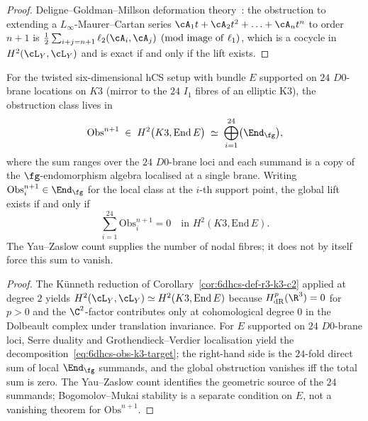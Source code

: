 \begin{proof}
Deligne--Goldman--Millson deformation
theory~\cite[Ch.~4]{CostelloGwilliam2017}: the obstruction to
extending a $L_\infty$-Maurer--Cartan series $\cA_1 t +
\cA_2 t^2 + \ldots + \cA_n t^n$ to order $n+1$ is
$\tfrac12\sum_{i+j = n+1}\ell_2(\cA_i,\cA_j) \pmod{\mathrm{image\
of\ }\ell_1}$, which is a cocycle in
$H^2(\cL_Y,\cL_Y)$ and is exact if and only if the lift exists.
\end{proof}

\begin{corollary}[Obstruction for $Y = \R^3\times K3\times\C^2$
 with $24$ $D0$-branes; \ClaimStatusProvedHere]
\label{cor:6dhcs-obs-k3}
For the twisted six-dimensional hCS setup with bundle $E$ supported on
$24$ $D0$-brane locations on $K3$ (mirror to the $24$ $I_1$ fibres of
an elliptic K3), the obstruction class lives in
\begin{equation}\label{eq:6dhcs-obs-k3-target}
 \mathrm{Obs}^{n+1} \;\in\; H^2\bigl(K3,\mathrm{End}\,E\bigr)
 \;\simeq\;
 \bigoplus_{i = 1}^{24}\bigl(\End_{\fg}\bigr),
\end{equation}
where the sum ranges over the $24$ $D0$-brane loci and each summand
is a copy of the $\fg$-endomorphism algebra localised at a single
brane. Writing
\(\mathrm{Obs}^{n+1}_i\in\End_\fg\) for the local class at the
\(i\)-th support point, the global lift exists if and only if
\[
 \sum_{i=1}^{24}\mathrm{Obs}^{n+1}_i=0
 \quad\text{in }H^2(K3,\mathrm{End}\,E).
\]
The Yau--Zaslow count supplies the number of nodal fibres; it does not
by itself force this sum to vanish.
\end{corollary}

\begin{proof}
The K\"unneth reduction
of Corollary~\ref{cor:6dhcs-def-r3-k3-c2} applied at degree $2$
yields $H^2(\cL_Y,\cL_Y) \simeq H^2(K3,\mathrm{End}\,E)$ because
$H^p_{\mathrm{dR}}(\R^3) = 0$ for $p > 0$ and the $\C^2$-factor
contributes only at cohomological degree $0$ in the Dolbeault
complex under translation invariance. For $E$ supported on $24$
$D0$-brane loci, Serre duality and Grothendieck--Verdier
localisation yield the decomposition~\eqref{eq:6dhcs-obs-k3-target};
the right-hand side is the $24$-fold direct sum of local
$\End_\fg$ summands, and the global obstruction vanishes iff the
total sum is zero. The Yau--Zaslow count identifies the geometric
source of the \(24\) summands; Bogomolov--Mukai stability is a
separate condition on \(E\), not a vanishing theorem for
\(\mathrm{Obs}^{n+1}\).
\end{proof}

